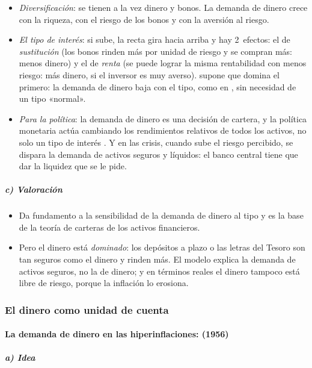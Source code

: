 \documentclass[11pt]{article}
\begin{document}
\begin{itemize}
\item \emph{Diversificación}: se tienen a la vez dinero y bonos. La demanda de dinero crece con la riqueza, con el riesgo de los bonos y con la aversión al riesgo.
\item \emph{El tipo de interés}: si sube, la recta gira hacia arriba y hay 2~efectos: el de \emph{sustitución} (los bonos rinden más por unidad de riesgo y se compran más: menos dinero) y el de \emph{renta} (se puede lograr la misma rentabilidad con menos riesgo: más dinero, si el inversor es muy averso).  supone que domina el primero: la demanda de dinero baja con el tipo, como en , sin necesidad de un tipo «normal».
\item \emph{Para la política}: la demanda de dinero es una decisión de cartera, y la política monetaria actúa cambiando los rendimientos relativos de todos los activos, no solo un tipo de interés . Y en las crisis, cuando sube el riesgo percibido, se dispara la demanda de activos seguros y líquidos: el banco central tiene que dar la liquidez que se le pide.
\end{itemize}

\subparagraph{c) Valoración}

\begin{itemize}
\item Da fundamento a la sensibilidad de la demanda de dinero al tipo y es la base de la teoría de carteras de los activos financieros.
\item Pero el dinero está \emph{dominado}: los depósitos a plazo o las letras del Tesoro son tan seguros como el dinero y rinden más. El modelo explica la demanda de activos seguros, no la de dinero; y en términos reales el dinero tampoco está libre de riesgo, porque la inflación lo erosiona.
\end{itemize}

\subsubsection{El dinero como unidad de cuenta}\label{sec:unidad-cuenta}

\paragraph{La demanda de dinero en las hiperinflaciones:  (1956)}

\subparagraph{a) Idea}
\end{document}
